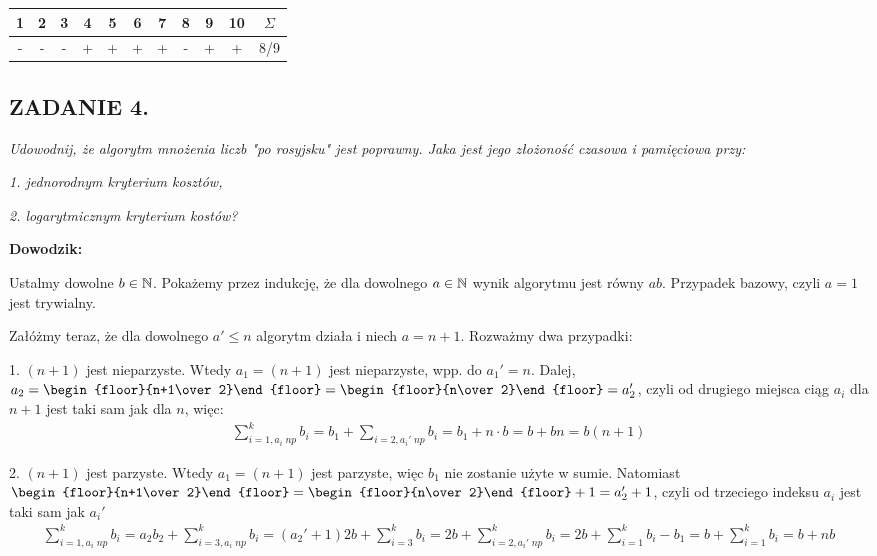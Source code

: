 \documentclass{article}
\begin{document}
\begin{center}\begin{tabular}{| c | c | c | c | c | c | c | c | c | c | c |}
    \hline

    1 & 2 & 3 & 4 & 5 & 6 & 7 & 8 & 9 & 10 & $\Sigma$\\

    \hline

    - & - & - & + & + & + & + & - & + & + & 8/9\\

    \hline
\end{tabular}\end{center}

\subsection*{ZADANIE 4.}
\emph{Udowodnij, że algorytm mnożenia liczb "po rosyjsku" jest poprawny. Jaka jest jego złożoność czasowa i pamięciowa przy:}

\emph{1. jednorodnym kryterium kosztów,}

\emph{2. logarytmicznym kryterium kostów?}
\medskip

\textbf{Dowodzik:}

Ustalmy dowolne $b\in\mathbb{N}$. Pokażemy przez indukcję, że dla dowolnego $a\in\mathbb{N}$ wynik algorytmu jest równy $ab$. Przypadek bazowy, czyli $a=1$ jest trywialny. 

Załóżmy teraz, że dla dowolnego $a'\leq n$ algorytm działa i niech $a=n+1$. Rozważmy dwa przypadki:

1. $(n+1)$ jest nieparzyste. Wtedy $a_1=(n+1)$ jest nieparzyste, wpp. do $a_1'=n$. Dalej, $a_2=\begin{floor}{n+1\over 2}\end{floor}=\begin{floor}{n\over 2}\end{floor}=a_2'$, czyli od drugiego miejsca ciąg $a_i$ dla $n+1$ jest taki sam jak dla $n$, więc:
\begin{align*}
    \sum\limits_{i=1,a_i \;np}^kb_i=b_1+\sum\limits_{i=2,a_i'\; np} b_i=b_1+n\cdot b=b+bn=b(n+1)
\end{align*}

2. $(n+1)$ jest parzyste. Wtedy $a_1=(n+1)$ jest parzyste, więc $b_1$ nie zostanie użyte w sumie. Natomiast $\begin{floor}{n+1\over 2}\end{floor}=\begin{floor}{n\over 2}\end{floor}+1=a_2'+1$, czyli od trzeciego indeksu $a_i$ jest taki sam jak $a_i'$
\begin{align*}
    \sum\limits_{i=1, a_i \;np}^kb_i=a_2b_2+\sum\limits_{i=3,a_i\;np}^kb_i=(a_2'+1)2b+\sum\limits_{i=3}^k b_i=2b+\sum\limits_{i=2,a_i'\;np}^kb_i=2b+\sum\limits_{i=1}^kb_i-b_1=b+\sum\limits_{i=1}^kb_i=b+nb
\end{align*}
\end{document}
